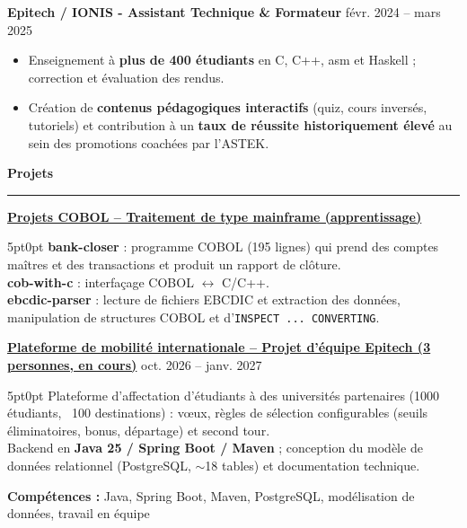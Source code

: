 \documentclass[9pt]{extarticle}
\begin{document}
\par\vspace{5pt}

{\bfseries Epitech / IONIS - Assistant Technique \& Formateur} \hfill févr. 2024 -- mars 2025
\begin{itemize}[noitemsep, topsep=0pt]
	\item Enseignement à {\bfseries plus de 400 étudiants} en C, C++, asm et Haskell ; correction et évaluation des rendus.
	\item Création de {\bfseries contenus pédagogiques interactifs} (quiz, cours inversés, tutoriels) et contribution à un {\bfseries taux de réussite historiquement élevé} au sein des promotions coachées par l'ASTEK.
\end{itemize}

\par\vspace{5pt}

{\large\bfseries Projets}
\par\vspace{-8pt}
\rule{\linewidth}{0.4pt}
\par\vspace{5pt}

\underline{\bfseries Projets COBOL -- Traitement de type mainframe (apprentissage)}
\par
\begin{adjustwidth}{5pt}{0pt}
    \textbf{bank-closer} : programme COBOL (195 lignes) qui prend des comptes maîtres et des transactions et produit un rapport de clôture. \\
    \textbf{cob-with-c} : interfaçage COBOL $\leftrightarrow$ C/C++. \\
    \textbf{ebcdic-parser} : lecture de fichiers EBCDIC et extraction des données, manipulation de structures COBOL et d'\texttt{INSPECT ... CONVERTING}.
\end{adjustwidth}

\par\vspace{8pt}

\underline{\bfseries Plateforme de mobilité internationale -- Projet d'équipe Epitech (3 personnes, en cours)} \hfill oct. 2026 -- janv. 2027
\par
\begin{adjustwidth}{5pt}{0pt}
    Plateforme d'affectation d'étudiants à des universités partenaires (1000 étudiants, ~100 destinations) : vœux, règles de sélection configurables (seuils éliminatoires, bonus, départage) et second tour. \\
    Backend en {\bfseries Java 25 / Spring Boot / Maven} ; conception du modèle de données relationnel (PostgreSQL, $\sim$18 tables) et documentation technique.
\end{adjustwidth}
\par
{\bfseries Compétences :} Java, Spring Boot, Maven, PostgreSQL, modélisation de données, travail en équipe
\end{document}
